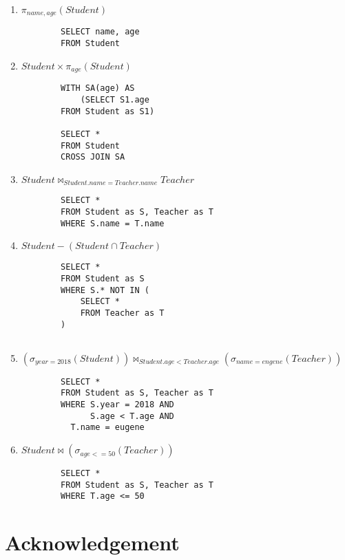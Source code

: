 \documentclass{article}
\begin{document}
\begin{enumerate}
    \item $\pi _{name,age}(Student)$
    \begin{lstlisting}
        SELECT name, age 
        FROM Student
    \end{lstlisting}
    
    \item $Student \times \pi_{age}(Student)$
    \begin{lstlisting}
        WITH SA(age) AS
        	(SELECT S1.age
		FROM Student as S1)
          
        SELECT * 
        FROM Student
        CROSS JOIN SA  
    \end{lstlisting}
    
    \item $Student \bowtie_{Student.name=Teacher.name} Teacher $
    \begin{lstlisting}
        SELECT *
        FROM Student as S, Teacher as T
        WHERE S.name = T.name
    \end{lstlisting}
    
    \item $Student - (Student \cap Teacher)$
    \begin{lstlisting}
        SELECT *
        FROM Student as S
        WHERE S.* NOT IN (  
        	SELECT *
       		FROM Teacher as T
        )
        
    \end{lstlisting}
    
    \item $(\sigma_{year=2018}(Student) )\bowtie_{Student.age < Teacher.age} (\sigma_{name=engene}(Teacher))$
    \begin{lstlisting}
        SELECT *
        FROM Student as S, Teacher as T
        WHERE S.year = 2018 AND
      	      S.age < T.age AND 
	      T.name = eugene
    \end{lstlisting}
    
    \item $Student \bowtie (\sigma_{age<=50}(Teacher))$
    \begin{lstlisting}
        SELECT *
        FROM Student as S, Teacher as T
        WHERE T.age <= 50
    \end{lstlisting}
\end{enumerate}


\newpage
\section{Acknowledgement}
\end{document}
